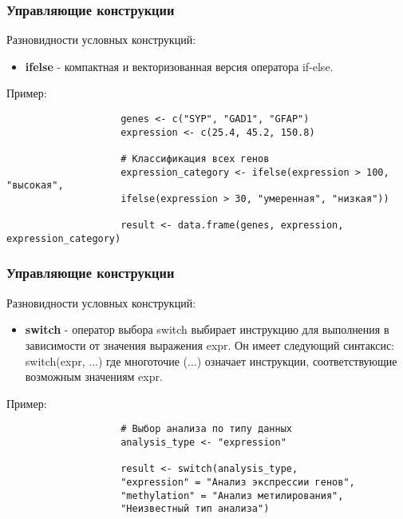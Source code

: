 \documentclass[10pt]{beamer}
\begin{document}
	\begin{frame}[fragile]
		\frametitle{Управляющие конструкции}
		Разновидности условных конструкций:
		\begin{itemize}
			\item \textbf{ifelse} - компактная и векторизованная версия оператора if-else.
		\end{itemize}
		
		\begin{exampleblock}{Пример:}
			{\footnotesize
				\begin{verbatim}
					genes <- c("SYP", "GAD1", "GFAP")
					expression <- c(25.4, 45.2, 150.8)
					
					# Классификация всех генов
					expression_category <- ifelse(expression > 100, "высокая",
					ifelse(expression > 30, "умеренная", "низкая"))
					
					result <- data.frame(genes, expression, expression_category)
				\end{verbatim}
			}
		\end{exampleblock}
	\end{frame}
	
	\begin{frame}[fragile]
		\frametitle{Управляющие конструкции}
		Разновидности условных конструкций:
		\begin{itemize}
			\item \textbf{switch} - оператор выбора switch выбирает инструкцию для выполнения в зависимости от значения выражения expr. Он имеет следующий синтаксис: switch(expr, ...) где многоточие (...) означает инструкции, соответствующие возможным значениям expr.
		\end{itemize}
		
		\begin{exampleblock}{Пример:}
			{\footnotesize
				\begin{verbatim}
					# Выбор анализа по типу данных
					analysis_type <- "expression"
					
					result <- switch(analysis_type,
					"expression" = "Анализ экспрессии генов",
					"methylation" = "Анализ метилирования", 
					"Неизвестный тип анализа")
				\end{verbatim}
			}
		\end{exampleblock}
	\end{frame}
	
\end{document}
